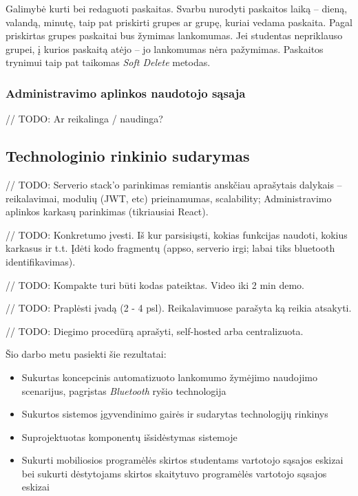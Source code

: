 \documentclass{VUMIFPSkursinis}
\begin{document}

Galimybė kurti bei redaguoti paskaitas. Svarbu nurodyti paskaitos laiką – dieną, valandą, minutę, taip pat priskirti grupes ar grupę, kuriai vedama paskaita. Pagal priskirtas grupes paskaitai bus žymimas lankomumas. Jei studentas nepriklauso grupei, į kurios paskaitą atėjo – jo lankomumas nėra pažymimas. Paskaitos trynimui taip pat taikomas \textit{Soft Delete} metodas.

\subsubsection{Administravimo aplinkos naudotojo sąsaja}

// TODO: Ar reikalinga / naudinga?

\subsection{Technologinio rinkinio sudarymas}

// TODO: Serverio stack'o parinkimas remiantis anskčiau aprašytais dalykais – reikalavimai, modulių (JWT, etc) prieinamumas, scalability; Administravimo aplinkos karkasų parinkimas (tikriausiai React).

// TODO: Konkretumo įvesti. Iš kur parsisiųsti, kokias funkcijas naudoti, kokius karkasus ir t.t. Įdėti kodo fragmentų (appso, serverio irgi; labai tiks bluetooth identifikavimas). 

// TODO: Kompakte turi būti kodas pateiktas. Video iki 2 min demo.

// TODO: Praplėsti įvadą (2 - 4 psl). Reikalavimuose parašyta ką reikia atsakyti.

// TODO: Diegimo procedūrą aprašyti, self-hosted arba centralizuota.


Šio darbo metu pasiekti šie rezultatai:

\begin{itemize}
	\item Sukurtas koncepcinis automatizuoto lankomumo žymėjimo naudojimo scenarijus, pagrįstas \textit{Bluetooth} ryšio technologija
	\item Sukurtos sistemos įgyvendinimo gairės ir sudarytas technologijų rinkinys
	\item Suprojektuotas komponentų išsidėstymas sistemoje
	\item Sukurti mobiliosios programėlės skirtos studentams vartotojo sąsajos eskizai bei sukurti dėstytojams skirtos skaitytuvo programėlės vartotojo sąsajos eskizai
\end{itemize}
\end{document}
